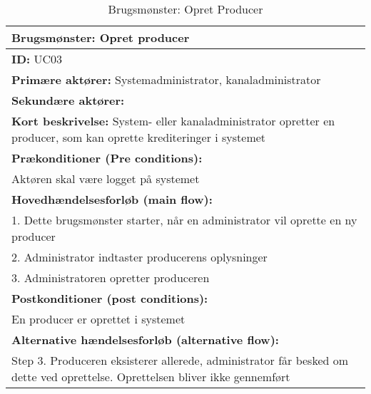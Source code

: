 \begin{table}[ht]
    \begin{tabularx}{\textwidth}{|X|}
        \hline
        \textbf{Brugsmønster:}  Opret producer \\ \hline
        \textbf{ID:} UC03 \\ \hline
        \textbf{Primære aktører:} Systemadministrator, kanaladministrator \\ \hline
        \textbf{Sekundære aktører:} \\ \hline
        \textbf{Kort beskrivelse:} System- eller kanaladministrator opretter en producer, som kan oprette       krediteringer i systemet \\ \hline
        \textbf{Prækonditioner (Pre conditions):} \\
        Aktøren skal være logget på systemet \\ \hline
        \textbf{Hovedhændelsesforløb (main flow):} \\
            1. Dette brugsmønster starter, når en administrator vil oprette en ny producer \\
            2. Administrator indtaster producerens oplysninger \\ 
            3. Administratoren opretter produceren \\ \hline
        \textbf{Postkonditioner (post conditions):} \\
            En producer er oprettet i systemet \\ \hline
        \textbf{Alternative hændelsesforløb (alternative flow):} \\ Step 3. Produceren eksisterer allerede,     administrator får besked om dette ved oprettelse. Oprettelsen bliver ikke gennemført \\
        \hline
    \end{tabularx}
    \caption{Brugsmønster: Opret Producer}
    \label{table:create_producer}
\end{table}


